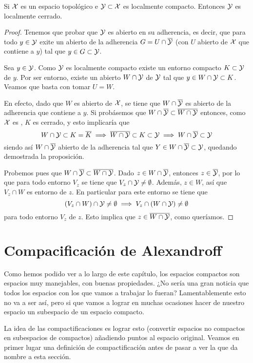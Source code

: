\begin{prop}
	Si $\mathcal{X}$ es un espacio topológico \hausdorff e $\mathcal{Y}\subset\mathcal{X}$ es localmente compacto. Entonces $\mathcal{Y}$ es localmente cerrado.
\end{prop}
\begin{proof}
	Tenemos que probar que $\mathcal{Y}$ es abierto en su adherencia, es decir, que para todo $y\in\mathcal{Y}$ exite un abierto de la adherencia $G=U\cap\overline{\mathcal{Y}}$ (con $U$ abierto de $\mathcal{X}$ que contiene a $y$) tal que $y\in G\subset \mathcal{Y}$.
	
	Sea $y\in\mathcal{Y}$. Como $\mathcal{Y}$ es localmente compacto existe un entorno compacto $K\subset\mathcal{Y}$ de $y$. Por ser entorno, existe un abierto $W\cap\mathcal{Y}$ de $\mathcal{Y}$ tal que $y\in W\cap\mathcal{Y}\subset K$. Veamos que basta con tomar $U=W$.
	
	En efecto, dado que $W$ es abierto de $\mathcal{X}$, se tiene que $W\cap \overline{\mathcal{Y}}$ es abierto de la adherencia que contiene a $y$. Si probásemos que $W\cap \overline{\mathcal{Y}}\subset \overline{W\cap\mathcal{Y}}$ entonces, como $\mathcal{X}$ es \hausdorff, $K$ es cerrado, y esto implicaría que
	\[W\cap \mathcal{Y}\subset K=\overline{K}\implies \overline{W\cap\mathcal{Y}}\subset K\subset\mathcal{Y}\implies W\cap \overline{\mathcal{Y}}\subset\mathcal{Y} \]
	siendo así $W\cap \overline{\mathcal{Y}}$ abierto de la adherencia tal que $Y\in W\cap \overline{\mathcal{Y}}\subset\mathcal{Y}$, quedando demostrada la proposición.
	
	Probemos pues que $W\cap \overline{\mathcal{Y}}\subset \overline{W\cap\mathcal{Y}}$. Dado $z\in W\cap \overline{\mathcal{Y}}$, entonces $z\in \overline{\mathcal{Y}}$, por lo que para todo entorno $V_z$ se tiene que $V_z\cap\mathcal{Y}\not=\emptyset$. Además, $z\in W$, así que $V_z\cap W$ es entorno de $z$. En particular para este entorno se tiene que
	\[(V_z\cap W)\cap \mathcal{Y}\not=\emptyset\implies V_z\cap(W\cap\mathcal{Y})\not=\emptyset\]
	para todo entorno $V_z$ de $z$. Esto implica que $z\in \overline{W\cap\mathcal{Y}}$, como queríamos.
\end{proof}

\section{Compacificación de Alexandroff}

Como hemos podido ver a lo largo de este capítulo, los espacios compactos son espacios muy manejables, con buenas propiedades. ¿No sería una gran noticia que todos los espacios con los que vamos a trabajar lo fueran? Lamentablemente esto no va a ser así, pero si que vamos a lograr en muchas ocasiones hacer de nuestro espacio un subespacio de un espacio compacto.


La idea de las compactificaciones es lograr esto (convertir espacios no compactos en subespacios de compactos) añadiendo puntos al espacio original.
Veamos en primer lugar una definición de compactificación antes de pasar a ver la que da nombre a esta sección.

